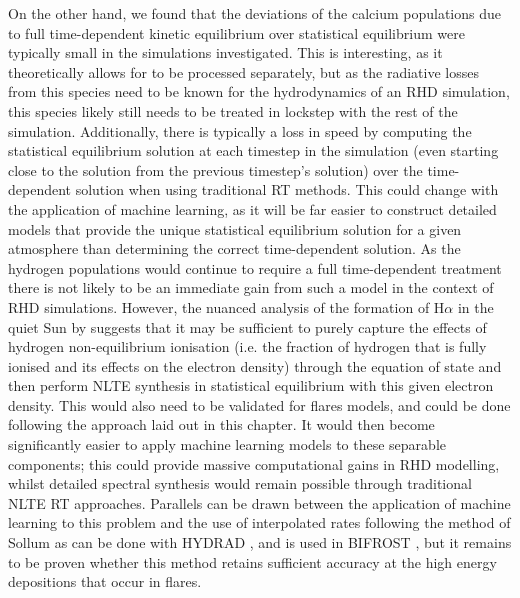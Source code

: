 On the other hand, we found that the deviations of the calcium populations due to full time-dependent kinetic equilibrium over statistical equilibrium were typically small in the simulations investigated.
This is interesting, as it theoretically allows for \Caii{} to be processed separately, but as the radiative losses from this species need to be known for the hydrodynamics of an RHD simulation, this species likely still needs to be treated in lockstep with the rest of the simulation.
Additionally, there is typically a loss in speed by computing the statistical equilibrium solution at each timestep in the simulation (even starting close to the solution from the previous timestep's solution) over the time-dependent solution when using traditional RT methods.
This could change with the application of machine learning, as it will be far easier to construct detailed models that provide the unique statistical equilibrium solution for a given atmosphere than determining the correct time-dependent solution.
As the hydrogen populations would continue to require a full time-dependent treatment there is not likely to be an immediate gain from such a model in the context of RHD simulations.
However, the nuanced analysis of the formation of H$\alpha$ in the quiet Sun by \citet{Leenaarts2012a} suggests that it may be sufficient to purely capture the effects of hydrogen non-equilibrium ionisation (i.e. the fraction of hydrogen that is fully ionised and its effects on the electron density) through the equation of state and then perform NLTE synthesis in statistical equilibrium with this given electron density.
This would also need to be validated for flares models, and could be done following the approach laid out in this chapter.
It would then become significantly easier to apply machine learning models to these separable components; this could provide massive computational gains in RHD modelling, whilst detailed spectral synthesis would remain possible through traditional NLTE RT approaches.
Parallels can be drawn between the application of machine learning to this problem and the use of interpolated rates following the method of Sollum \NeedRef{} as can be done with HYDRAD \citep{Reep2019}, and is used in BIFROST \citep{Gudiksen2011}, but it remains to be proven whether this method retains sufficient accuracy at the high energy depositions that occur in flares.

